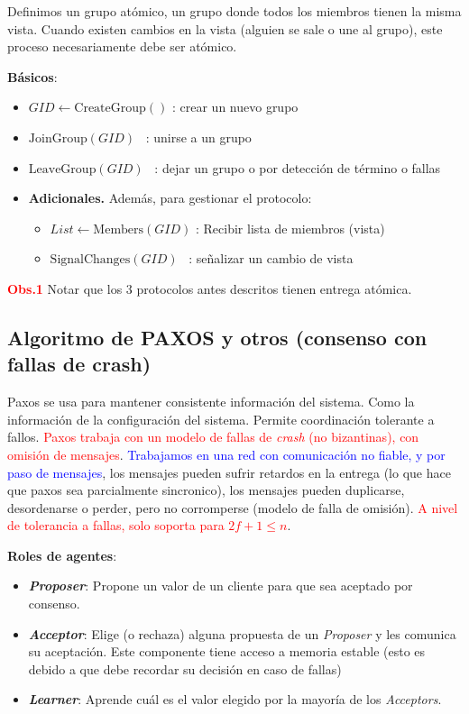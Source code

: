 Definimos un grupo atómico, un grupo donde todos los miembros tienen la misma vista. Cuando existen cambios en la vista (alguien se sale o une al grupo), este proceso necesariamente debe ser atómico.

\textbf{Básicos}:
\begin{itemize}
    \item $\mathit{GID} \leftarrow \text{CreateGroup}()$ \quad : crear un nuevo grupo
    \item $\text{JoinGroup}(\mathit{GID})$ \quad \quad \ : unirse a un grupo
    \item $\text{LeaveGroup}(\mathit{GID})$ \quad \ : dejar un grupo o por detección de término o fallas
\end{itemize}

 \begin{itemize}
     \item \textbf{Adicionales.} Además, para gestionar el protocolo:
     \begin{itemize}
         \item $\mathit{List} \leftarrow \text{Members}(\mathit{GID})$ \quad : Recibir lista de miembros (vista)
         \item $\text{SignalChanges}(\mathit{GID})$ \ : señalizar un cambio de vista
     \end{itemize}
 \end{itemize}
\textcolor{red}{\textbf{Obs.1}} Notar que los 3 protocolos antes descritos tienen entrega atómica.


\subsection{Algoritmo de PAXOS y otros (consenso con fallas de crash)}

Paxos se usa para mantener consistente información del sistema. Como la información de la configuración del sistema. Permite coordinación tolerante a fallos. \textcolor{red}{Paxos trabaja con un modelo de fallas de \textit{crash} (no bizantinas), con omisión de mensajes}. \textcolor{blue}{Trabajamos en una red con comunicación no fiable, y por paso de mensajes}, los mensajes pueden sufrir retardos en la entrega (lo que hace que paxos sea parcialmente sincronico), los mensajes pueden duplicarse, desordenarse o perder, pero no corromperse (modelo de falla de omisión). \textcolor{red}{A nivel de tolerancia a fallas, solo soporta para $2f+1\leq n$}.

\textbf{Roles de agentes}:
\begin{itemize}
    \item \textbf{\textit{Proposer}}: Propone un valor de un cliente para que sea aceptado por consenso.
    \item \textbf{\textit{Acceptor}}: Elige (o rechaza) alguna propuesta de un \textit{Proposer} y les comunica su aceptación. Este componente tiene acceso a memoria estable (esto es debido a que debe recordar su decisión en caso de fallas)
    \item \textbf{\textit{Learner}}: Aprende cuál es el valor elegido por la mayoría de los \textit{Acceptors}.
\end{itemize}


